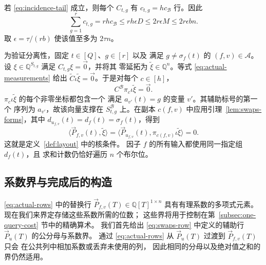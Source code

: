 \documentclass[11pt,reqno]{amsart}
\numberwithin{equation}{section}
\theoremstyle{definition}\newtheorem{definition}[theorem]{定义}
\theoremstyle{remark}\newtheorem{remark}[theorem]{注}
\renewcommand{\le}{\leqslant}
\begin{document}
若 \eqref{eq:incidence-tail} 成立，则每个 $C_{t,g}$ 有
$c_{t,g}=hc_{\mathcal B}$ 行。因此
\begin{equation}\label{eq:incidence-measurement-count}
 \sum_{g=1}^r c_{t,g}=rh c_{\mathcal B}
 \le rh\epsilon D\le2r\epsilon M\le2r\epsilon bn.
\end{equation}
取 $\epsilon=\tau/(rb)$ 使该值至多为 $2\tau n$。

为验证分离性，固定 $t\in[Q]$、$g\in[r]$ 以及
满足 $g\ne\sigma_f(t)$ 的
$(f,v)\in\mathcal A$。设
$\xi\in\mathbb Q^{S_{t,g}}$ 满足 $C_{t,g}\xi=\vec{0}$，并将其
零延拓为 $\widetilde\xi\in\mathbb Q^n$。等式
\eqref{eq:actual-measurements} 给出
$\widetilde C\iota\widetilde\xi=\vec{0}$。于是对每个 $c\in[h]$，
\[
 C^{\mathcal B}\pi_c\iota\widetilde\xi=\vec{0}.
\]
$\pi_c\iota\widetilde\xi$ 的每个非零坐标都包含一个
满足 $a_{v'}(t)=g$ 的变量 $v'$。其辅助标号的第一个
序列为 $a_{v'}$，故该向量支撑在
$S^{\mathcal B}_{t,g}$ 上。在副本
$c(f,v)$ 中应用引理~\ref{lem:swaps-forms}，其中 $d_{u_{f,v}}(t)=d_f(t)=\sigma_f(t)$，得到
\[
 \langle \vec{P}_{f,v}(t), \widetilde\xi\rangle
 =\langle \vec{P}_{u_{f,v}}(t), \pi_{c(f,v)}\iota\widetilde\xi\rangle=0.
\]
这就是定义~\ref{def:layout} 中的核条件。
因子 $f$ 的所有输入都使用同一指定组 $d_f(t)$，且
求和计数仍恰好遍历 $n$ 个布尔位。
\subsection{系数界与完成后的构造}
\eqref{eq:actual-rows} 中的替换行 $\vec{P}_{f,v}(T)\in\mathbb Q[T]^{1\times n}$
具有有理系数的多项式元素。现在我们来界定存储这些系数所需的位数；
这些界将用于控制在第~\ref{subsec:one-query-cost} 节中的精确算术。
我们首先给出 \eqref{eq:swaps-row} 中定义的辅助行 $\vec{P}_u(T)$ 的公分母与系数界。
通过 \eqref{eq:actual-rows} 从 $\vec{P}_u(T)$ 过渡到 $\vec{P}_{f,v}(T)$ 只会
在公共列中相加系数或丢弃未使用的列，
因此相同的分母以及绝对值之和的界仍然适用。
\end{document}
